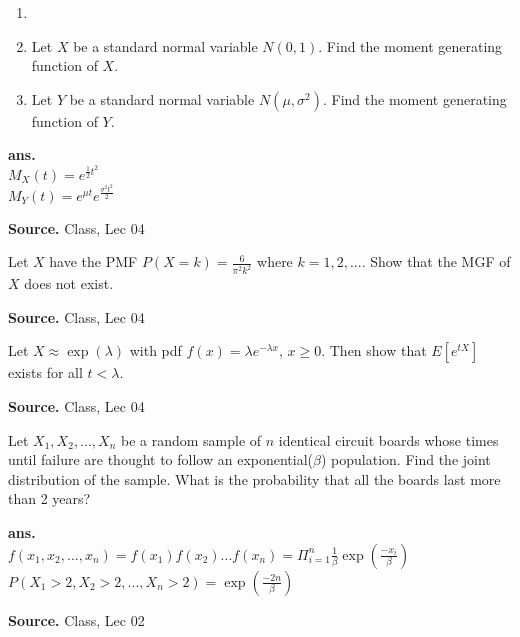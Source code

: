 \documentclass[12pt,twoside]{report}
\newenvironment*{ans}{\textbf{ans.}\space\em\\}{\par}
\newenvironment*{source}{\hfill\scriptsize\textbf{Source.}\space}{\par}
\begin{document}
\begin{samepage}
\begin{ex}
    \begin{enumerate}[label=(\roman*)]
        \item[]
        \item Let $X$ be a standard normal variable $N(0,1)$. Find the moment generating function of $X$.
        \item Let $Y$ be a standard normal variable $N(\mu,\sigma ^2)$. Find the moment generating function of $Y$.
    \end{enumerate}
\end{ex}
\begin{ans}
$M_X(t) = e^{\frac{1}{2} t^2}$ \\
$M_Y(t) = e^{\mu t} e^{\frac{\sigma^2 t^2}{2}}$ 
\end{ans}
\begin{source}
Class, Lec 04
\end{source}
\end{samepage}

\begin{samepage}
\begin{ex}
Let $X$ have the PMF $P(X = k) = \frac{6}{\pi ^2 k^2}$ where $k = 1,2, ...$.
Show that the MGF of $X$ does not exist.
\end{ex}
\begin{source}
Class, Lec 04
\end{source}
\end{samepage}

\begin{samepage}
\begin{ex}
Let $X \approx \exp(\lambda)$ with pdf $f(x) = \lambda e^{- \lambda x}$, $x \geq 0$. Then show that $E[e^{tX}]$ exists for all $t < \lambda$.
\end{ex}
\begin{source}
Class, Lec 04
\end{source}
\end{samepage}

\begin{ex}
Let $X_1, X_2, ..., X_n$ be a random sample of $n$ identical circuit boards whose times until failure are thought to follow an exponential($\beta$) population. Find the joint distribution of the sample. What is the probability that all the boards last more than 2 years?
\end{ex}
\begin{ans}
$f(x_1, x_2, ..., x_n)  = f(x_1) f(x_2) ... f(x_n) = \Pi_{i=1}^n \frac{1}{\beta} \exp(\frac{-x_i}{\beta})$ \\
$P(X_1 > 2, X_2 > 2, ..., X_n > 2) = \exp(\frac{-2n}{\beta})$
\end{ans}
\begin{source}
    Class, Lec 02
\end{source}
\end{document}
